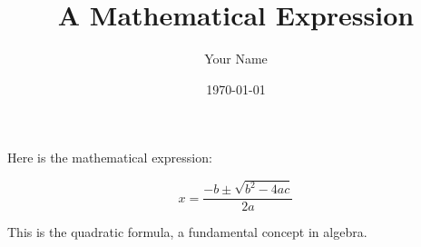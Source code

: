\documentclass{article}
\begin{document}
\title{A Mathematical Expression}
\author{Your Name}
\date{\today}

\maketitle

Here is the mathematical expression:

\begin{equation}
  x = \frac{-b \pm \sqrt{b^2 - 4ac}}{2a}
\end{equation}

This is the quadratic formula, a fundamental concept in algebra.
\end{document}
